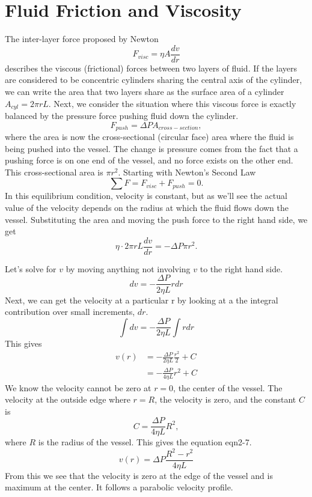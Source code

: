 \chapter{Fluid Friction and Viscosity}\label{appendix_fluid}

The inter-layer force proposed by Newton $$F_{visc} = \eta A \frac{dv}{dr}$$
describes the viscous (frictional) forces between two layers of fluid. If the layers are considered to be concentric cylinders sharing the central axis of the cylinder, we can write the area that two layers share as the surface area of a cylinder $ A_{cyl} = 2\pi rL$.
Next, we consider the situation where this viscous force is exactly balanced by the pressure force pushing fluid down the cylinder.
$$F_{push} = \Delta P A_{cross-section},$$
where the area is now the cross-sectional (circular face) area where the fluid is being pushed into the vessel. The change is pressure comes from the fact that a pushing force is on one end of the vessel, and no force exists on the other end. This cross-sectional area is $\pi r^2$. Starting with Newton's Second Law
$$\sum F = F_{visc}+F_{push} = 0.$$
In this equilibrium condition, velocity is constant, but as we'll see the actual value of the velocity depends on the radius at which the fluid flows down the vessel. Substituting the area and moving the push force to the right hand side, we get
$$\eta \cdot 2\pi rL\frac{dv}{dr} = - \Delta P \pi r^2.$$

Let's solve for $v$ by moving anything not involving $v$ to the right hand side.
$$dv = -\frac{\Delta P}{2\eta L} r dr$$
Next, we can get the velocity at a particular r by looking at a the integral contribution over small increments, $dr$.
$$\int dv = - \frac{\Delta P}{2\eta L} \int r dr$$
This gives
\begin{align}\label{eq-appA1}
v(r) &= -\frac{\Delta P}{2\eta L} \frac{r^2}{2} + C \nonumber\\
      &= -\frac{\Delta P}{4\eta L}r^2+C
\end{align}
We know the velocity cannot be zero at $r=0$, the center of the vessel. The velocity at the outside edge where $r=R$, the velocity is zero, and the constant $C$ is
$$C =\frac{\Delta P}{4\eta L} R^2,$$
where $R$ is the radius of the vessel. This gives the equation {eqn2-7}.
$$v(r) = \Delta P\frac{R^2-r^2}{4\eta L}$$
From this we see that the velocity is zero at the edge of the vessel and is maximum at the center. It follows a parabolic velocity profile.

